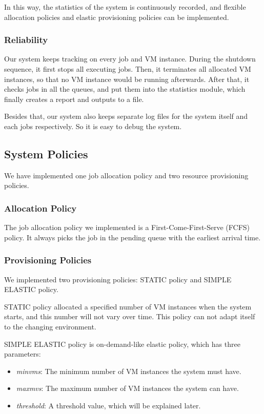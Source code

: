 In this way, the statistics of the system is continuously recorded, and flexible allocation policies and elastic provisioning policies can be implemented.


\subsubsection{Reliability}
Our system keeps tracking on every job and VM instance. During the shutdown sequence, it first stops all executing jobs. Then, it terminates all allocated VM instances, so that no VM instance would be running afterwards. After that, it checks jobs in all the queues, and put them into the statistics module, which finally creates a report and outputs to a file.

Besides that, our system also keeps separate log files for the system itself and each jobs respectively. So it is easy to debug the system.


\subsection{System Policies}
We have implemented one job allocation policy and two resource provisioning policies.

\subsubsection{Allocation Policy}
The job allocation policy we implemented is a First-Come-First-Serve (FCFS) policy. It always picks the job in the pending queue with the earliest arrival time.

\subsubsection{Provisioning Policies}
We implemented two provisioning policies: STATIC policy and SIMPLE ELASTIC policy.

STATIC policy allocated a specified number of VM instances when the system starts, and this number will not vary over time. This policy can not adapt itself to the changing environment.

SIMPLE ELASTIC policy is on-demand-like elastic policy, which has three parameters:

\begin{itemize}
\item \emph{minvms}: The minimum number of VM instances the system must have.
\item \emph{maxmvs}: The maximum number of VM instances the system can have.
\item \emph{threshold}: A threshold value, which will be explained later.
\end{itemize}

